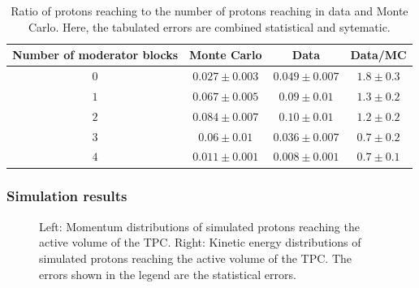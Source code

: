 \begin{table}
  \centering
  \caption[Comparison of number of protons reaching \SThree and \SFour in data and Monte Carlo]{Ratio of protons reaching \SFour to the number of protons reaching \SThree in data and Monte Carlo. Here, the tabulated errors are combined statistical and sytematic.}
  \begin{tabular}{c|c c c}
    \hline
    \hline
    Number of moderator blocks & Monte Carlo & Data & Data/MC\\
    \hline
    $0$ & $0.027 \pm 0.003$ & $0.049 \pm 0.007$ & $1.8 \pm 0.3$ \\
    $1$ & $0.067 \pm 0.005$ & $0.09 \pm 0.01$ & $1.3 \pm 0.2$ \\
    $2$ & $0.084 \pm 0.007$ & $0.10 \pm 0.01$ & $1.2 \pm 0.2$ \\
    $3$ & $0.06 \pm 0.01$ & $0.036 \pm 0.007$ & $0.7 \pm 0.2$ \\
    $4$ & $0.011 \pm 0.001$ & $0.008 \pm 0.001$ & $0.7 \pm 0.1$ \\
    \hline
  \end{tabular}
  \label{tab:s3s4Ratios}
\end{table}

\subsubsection{Simulation results}
\label{sec:hptpc_beam_flux:results:MCData:results}

\begin{figure}[h]
  \begin{minipage}[t]{.5\textwidth}
    \begin{adjustbox}{max totalsize=\textwidth, center}
      
    \end{adjustbox}
  \end{minipage}
  \hfill
  \begin{minipage}[t]{.5\textwidth}
    \begin{adjustbox}{max totalsize=\textwidth, center}
      
    \end{adjustbox}    
  \end{minipage}
  \caption[Momentum and kinetic energy distributions of simulated protons reaching the active volume of the TPC]{Left: Momentum distributions of simulated protons reaching the active volume of the TPC. Right: Kinetic energy distributions of simulated protons reaching the active volume of the TPC. The errors shown in the legend are the statistical errors.}
  \label{fig:protonTpcSim}
\end{figure}

